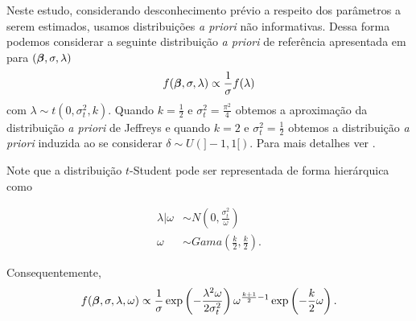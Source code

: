 Neste estudo, considerando desconhecimento prévio a respeito dos parâmetros a serem estimados, usamos distribuições \textit{a priori} não informativas. Dessa forma podemos considerar a seguinte distribuição \textit{a priori} de referência apresentada em \citet{Bayes2005:MSc} para $({\boldsymbol{\beta}},\sigma,\lambda)$
\begin{equation}
f({\boldsymbol{\beta}},\sigma,\lambda)\propto \frac{1}{\sigma}f(\lambda)
\end{equation}
com $\lambda \sim t(0,\sigma_t^2,k)$. Quando $k=\frac{1}{2}$ e $\sigma_t^2=\frac{\pi^2}{4}$ obtemos a aproximação da distribuição \textit{a priori} de Jeffreys e quando $k=2$ e $\sigma_t^2=\frac{1}{2}$ obtemos a distribuição \textit{a priori} induzida ao se considerar $\delta \sim U(]-1,1[)$. Para mais detalhes ver \citet{Bayes2005:MSc}.

Note que a distribuição $t$-Student pode ser representada de forma hierárquica como

\begin{equation}
\begin{split}
\lambda|\omega & \sim N\left(0,\frac{\sigma^2_t}{\omega}\right) \\
\omega & \sim Gama\left(\frac{k}{2},\frac{k}{2}\right).
\end{split}
\end{equation}
 
Consequentemente,
\begin{equation}
f({\boldsymbol{\beta}},\sigma,\lambda,\omega)\propto \frac{1}{\sigma}\exp\left(-\frac{\lambda^2\omega}{2\sigma_t^2}\right)\omega^{\frac{k+1}{2}-1}\exp\left(-\frac{k}{2}\omega\right).
\end{equation}

